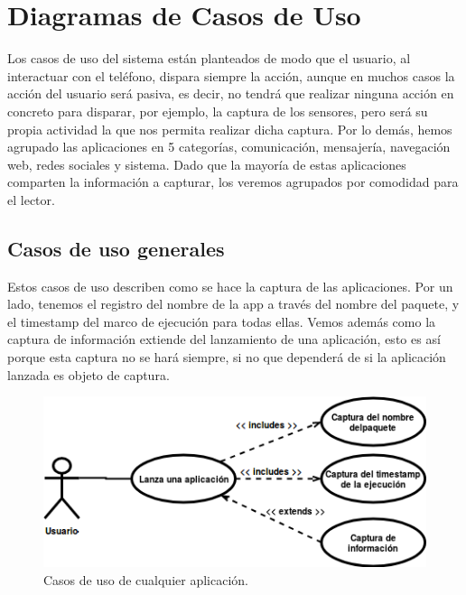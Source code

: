 \documentclass[12pt,a4paper,oneside]{book} %
\begin{document}
\section{Diagramas de Casos de Uso}
Los casos de uso del sistema están planteados de modo que el usuario, al interactuar con el teléfono, dispara siempre la acción, aunque en muchos casos la acción del usuario será pasiva, es decir, no tendrá que realizar ninguna acción en concreto para disparar, por ejemplo, la captura de los sensores, pero será su propia actividad la que nos permita realizar dicha captura. 
\newline
\newline
Por lo demás, hemos agrupado las aplicaciones en 5 categorías, comunicación, mensajería, navegación web, redes sociales y sistema. Dado que la mayoría de estas aplicaciones comparten la información a capturar, los veremos agrupados por comodidad para el lector. 
\subsection{Casos de uso generales}
Estos casos de uso describen como se hace la captura de las aplicaciones. Por un lado, tenemos el registro del nombre de la app a través del nombre del paquete, y el timestamp del marco de ejecución para todas ellas. Vemos además como la captura de información extiende del lanzamiento de una aplicación, esto es así porque esta captura no se hará siempre, si no que dependerá de si la aplicación lanzada es objeto de captura. 
\begin{figure}[H]
	\begin{center}
		\includegraphics[scale=0.7]{pictures/usecases/usecases01.png} %
	\end{center}
	\caption[Casos de uso de cualquier aplicación.]{Casos de uso de cualquier aplicación.}
\end{figure}
\end{document}
